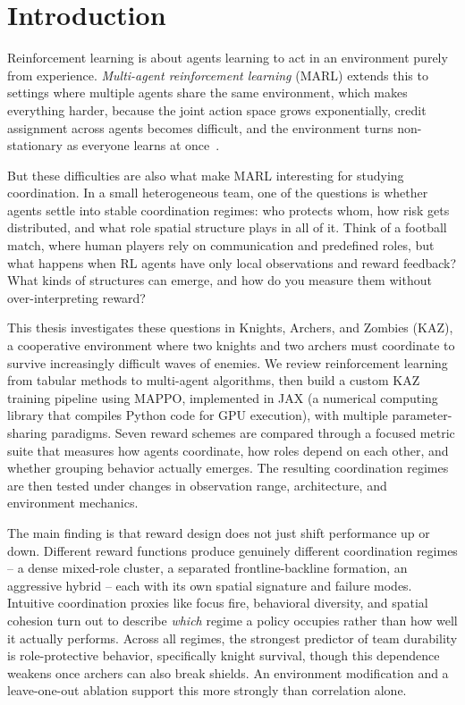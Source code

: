 \chapter{Introduction}
\label{chap:introduction}
Reinforcement learning is about agents learning to act in an environment purely from experience. \emph{Multi-agent reinforcement learning} (MARL) extends this to settings where multiple agents share the same environment, which makes everything harder, because the joint action space grows exponentially, credit assignment across agents becomes difficult, and the environment turns non-stationary as everyone learns at once~\cite{zhang2021, albrecht2024marl}.

But these difficulties are also what make MARL interesting for studying coordination. In a small heterogeneous team, one of the questions is whether agents settle into stable coordination regimes: who protects whom, how risk gets distributed, and what role spatial structure plays in all of it. Think of a football match, where human players rely on communication and predefined roles, but what happens when RL agents have only local observations and reward feedback? What kinds of structures can emerge, and how do you measure them without over-interpreting reward?

This thesis investigates these questions in Knights, Archers, and Zombies (KAZ), a cooperative environment where two knights and two archers must coordinate to survive increasingly difficult waves of enemies. We review reinforcement learning from tabular methods to multi-agent algorithms, then build a custom KAZ training pipeline using MAPPO, implemented in JAX (a numerical computing library that compiles Python code for GPU execution), with multiple parameter-sharing paradigms. Seven reward schemes are compared through a focused metric suite that measures how agents coordinate, how roles depend on each other, and whether grouping behavior actually emerges. The resulting coordination regimes are then tested under changes in observation range, architecture, and environment mechanics.

The main finding is that reward design does not just shift performance up or down. Different reward functions produce genuinely different coordination regimes -- a dense mixed-role cluster, a separated frontline-backline formation, an aggressive hybrid -- each with its own spatial signature and failure modes. Intuitive coordination proxies like focus fire, behavioral diversity, and spatial cohesion turn out to describe \emph{which} regime a policy occupies rather than how well it actually performs. Across all regimes, the strongest predictor of team durability is role-protective behavior, specifically knight survival, though this dependence weakens once archers can also break shields. An environment modification and a leave-one-out ablation support this more strongly than correlation alone.

